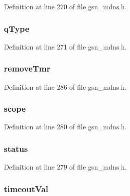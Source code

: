 Definition at line 270 of file gsn\_\-mdns.h.

\hypertarget{a00455_af988990cedc3c53e6fb79dec44129dd9}{
\subsubsection[{qType}]{ {\bf qType}}}
\label{a00455_af988990cedc3c53e6fb79dec44129dd9}


Definition at line 271 of file gsn\_\-mdns.h.

\hypertarget{a00455_ac5a72f209d95561607f46af972b8f8e2}{
\subsubsection[{removeTmr}]{ {\bf removeTmr}}}
\label{a00455_ac5a72f209d95561607f46af972b8f8e2}


Definition at line 286 of file gsn\_\-mdns.h.

\hypertarget{a00455_aa73cc4a6cdd8178cc27ecbdd515c750c}{
\subsubsection[{scope}]{ {\bf scope}}}
\label{a00455_aa73cc4a6cdd8178cc27ecbdd515c750c}


Definition at line 280 of file gsn\_\-mdns.h.

\hypertarget{a00455_ac4f6d5d1544a8d2c1309479ffe1b61ab}{
\subsubsection[{status}]{ {\bf status}}}
\label{a00455_ac4f6d5d1544a8d2c1309479ffe1b61ab}


Definition at line 279 of file gsn\_\-mdns.h.

\hypertarget{a00455_a3ff270d1f825f964298205e740de4e1e}{
\subsubsection[{timeoutVal}]{ {\bf timeoutVal}}}
\label{a00455_a3ff270d1f825f964298205e740de4e1e}


